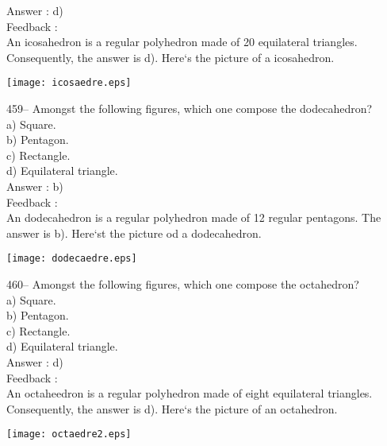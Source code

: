 ﻿\documentclass[letterpaper, 12pt]{article}
\begin{document}
Answer : d)\\

Feedback : \\
An icosahedron  is a regular polyhedron made of 20 equilateral triangles.  Consequently, the answer is d).  
Here`s the picture of a icosahedron.\\
    \begin{center}
    \texttt{[image: icosaedre.eps]}
    \end{center}


459-- Amongst the following figures, which one compose the dodecahedron?\\
a) Square.\\
b) Pentagon.\\
c) Rectangle.\\
d) Equilateral triangle.\\

Answer : b)\\

Feedback : \\
An dodecahedron is a regular polyhedron made of 12 regular pentagons.  The answer is b).  Here`st the picture od a dodecahedron.\\
    \begin{center}
    \texttt{[image: dodecaedre.eps]}
    \end{center}


460-- Amongst the following figures, which one compose the octahedron?\\
a) Square.\\
b) Pentagon.\\
c) Rectangle.\\
d) Equilateral triangle.\\

Answer : d)\\

Feedback : \\
An octaheedron is a regular polyhedron made of eight equilateral triangles.  Consequently, the answer is d).  Here`s the picture of an octahedron.\\
    \begin{center}
    \texttt{[image: octaedre2.eps]}
    \end{center}
\end{document}

